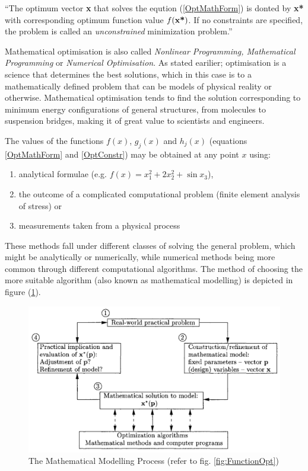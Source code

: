 ``The optimum vector \textbf{x} that solves the eqution (\ref{OptMathForm}) is donted by \textbf{x*} with corresponding optimum function value $f(\text{\textbf{x*}})$. If no constraints are specified, the problem is called an \emph{unconstrained} minimization problem.'' \cite{snyman05}

Mathematical optimisation is also called \emph{Nonlinear Programming, Mathematical Programming} or \emph{Numerical Optimisation}. As stated earilier; optimisation is a science that determines the best solutions, which in this case is to a mathematically defined problem that can be models of physical reality or otherwise. Mathematical optimisation tends to find the solution corresponding to minimum energy configurations of general structures, from molecules to suspension bridges, making it of great value to scientists and engineers.

The values of the functions $f(x)$, $g_j(x)$ and $h_j(x)$ (equations \ref{OptMathForm} and \ref{OptConstr}) may be obtained at any point $x$ using:
\vspace{-0.5cm}
\begin{enumerate}
\item analytical formulae (e.g. $f(x)=x_1 ^2+2x_2 ^2+\sin x_3$),
\item the outcome of a complicated computational problem (finite element analysis of stress) or
\item measurements taken from a physical process
\end{enumerate}
\vspace{-0.5cm}

These methods fall under different classes of solving the general problem, which might be analytically or numerically, while numerical methods being more common through different computational algorithms. The method of choosing the more suitable algorithm (also known as mathematical modelling) is depicted in figure (\ref{fig:MathModProc}).

\begin{figure}[htpb]
\centering
\includegraphics[width=\textwidth]{./Images/18-MathModProc}
\caption[Mathematical Modelling]{The Mathematical Modelling Process (refer to fig. \ref{fig:FunctionOpt}) \cite{snyman05}}
\label{fig:MathModProc}
\end{figure}

